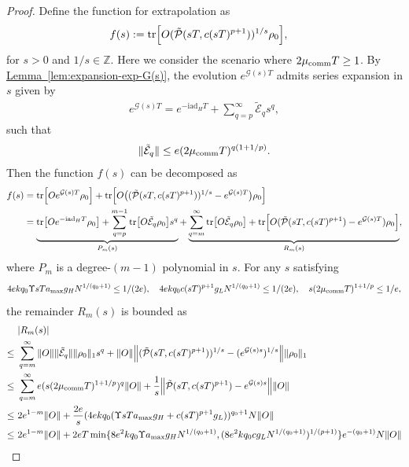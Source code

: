 \documentclass[11pt]{article}
\newcommand{\lem}[1]{\hyperref[lem:#1]{Lemma~\ref*{lem:#1}}}
\renewcommand{\i}{\mathrm{i}}
\newcommand{\ad}{\mathrm{ad}}
\newcommand{\G}{\mathcal{G}}
\newcommand{\E}{\mathcal{E}}
\newcommand{\mc}{\mathcal}
\newcommand{\mb}{\mathbb}
\begin{document}
\begin{proof}
    Define the function for extrapolation as \begin{align*}
        f(s)&:=\tr[O(\tilde{\mc P}(sT, c(sT)^{p+1}))^{1/s}\rho_0],
    \end{align*}
    for $s>0$ and $1/s\in \mb Z$.
    Here we consider the scenario where $2\mu_{\rm comm} T \ge 1$. By \lem{expansion-exp-G(s)}, the evolution $e^{\G(s) T}$ admits series expansion in $s$ given by \begin{align*}
        e^{\G(s) T}=e^{-\i \ad_H T}+ \sum_{q=p}^{\infty}\tilde{\E}_{q} s^q,
    \end{align*}
    such that \begin{align*}
        \|\tilde{\mc E}_q\|\le e (2\mu_{\rm comm}T)^{q(1+1/p)}.
    \end{align*}    
    Then the function $f(s)$ can be decomposed as \begin{align*}
        f(s)&= \tr[Oe^{\G(s)T} \rho_0]+\tr[O\bigl((\tilde{\mc P}(sT, c(sT)^{p+1}))^{1/s}-e^{\G(s)T}\bigr)\rho_0] \\
        &= \underbrace{\tr[Oe^{-\i \ad_H T}\rho_0]+\sum_{q=p}^{m-1}\tr[O \tilde{\mc E}_q\rho_0] s^q}_{P_m(s)}+\underbrace{\sum_{q=m}^{\infty}\tr[O\tilde{\mc E}_q\rho_0] + \tr[O(\tilde{\mc P}(sT, c(sT)^{p+1})-e^{\G(s)T})\rho_0]}_{R_m(s)},
    \end{align*}
    where $P_m$ is a degree-$(m-1)$ polynomial in $s$. For any $s$ satisfying \begin{align}
    \label{eq:cond-s}
        4ekq_0\Upsilon sT a_{\max} g_H N^{1/(q_0+1)}\le1/(2e), \quad 4ekq_0c(sT)^{p+1} g_LN^{1/(q_0+1)}\le 1/(2e),\quad s(2\mu_{\rm comm}T)^{1+1/p} \le 1/e,
    \end{align}the remainder $R_m(s)$ is bounded as \begin{align*}
        &|R_m(s)| \\
        \le ~&\sum_{q=m}^{\infty}\|O\|\|\tilde{\mc E}_q\|\|\rho_0\|_1 s^q + \|O\|\Big\|(\tilde{\mc P}(sT, c(sT)^{p+1}))^{1/s}-(e^{\G(s)s})^{1/s}\Big\|\|\rho_0\|_1 \\
        \le ~& \sum_{q=m}^{\infty} e(s(2\mu_{\rm comm} T)^{1+1/p})^{q}\|O\|+\frac{1}{s}\Bigl\|\tilde{\mc P}(sT, c(sT)^{p+1})-e^{\G(s)s}\Bigr\|\|O\|\\
        \le ~&2e^{1-m} \|O\|+ \frac{2e}{s}(4ekq_0(\Upsilon sT a_{\max}g_H+c(sT)^{p+1} g_L))^{q_0+1}N\|O\|\\
        \le ~& 2e^{1-m}\|O\|+2eT\min\{8e^2kq_0\Upsilon  a_{\max} g_H N^{1/(q_0+1)}, (8e^2kq_0c g_LN^{1/(q_0+1)})^{1/(p+1)}\}e^{-(q_0+1)}N\|O\|

\end{align*}
\end{proof}
\end{document}
